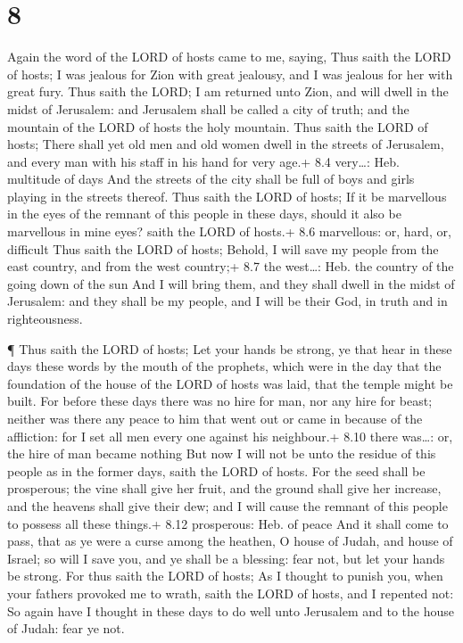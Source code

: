 \hypertarget{section-7}{%
\section{8}\label{section-7}}

 Again the word of the LORD of hosts came to me, saying,
 Thus saith the LORD of hosts; I was jealous for Zion with
great jealousy, and I was jealous for her with great fury. 
Thus saith the LORD; I am returned unto Zion, and will dwell in the
midst of Jerusalem: and Jerusalem shall be called a city of truth; and
the mountain of the LORD of hosts the holy mountain.  Thus
saith the LORD of hosts; There shall yet old men and old women dwell in
the streets of Jerusalem, and every man with his staff in his hand for
very age.+ 8.4 very\ldots: Heb. multitude of days  And the
streets of the city shall be full of boys and girls playing in the
streets thereof.  Thus saith the LORD of hosts; If it be
marvellous in the eyes of the remnant of this people in these days,
should it also be marvellous in mine eyes? saith the LORD of hosts.+ 8.6
marvellous: or, hard, or, difficult  Thus saith the LORD of
hosts; Behold, I will save my people from the east country, and from the
west country;+ 8.7 the west\ldots: Heb. the country of the going down of
the sun  And I will bring them, and they shall dwell in the
midst of Jerusalem: and they shall be my people, and I will be their
God, in truth and in righteousness.

 ¶ Thus saith the LORD of hosts; Let your hands be strong,
ye that hear in these days these words by the mouth of the prophets,
which were in the day that the foundation of the house of the LORD of
hosts was laid, that the temple might be built.  For before
these days there was no hire for man, nor any hire for beast; neither
was there any peace to him that went out or came in because of the
affliction: for I set all men every one against his neighbour.+ 8.10
there was\ldots: or, the hire of man became nothing  But
now I will not be unto the residue of this people as in the former days,
saith the LORD of hosts.  For the seed shall be prosperous;
the vine shall give her fruit, and the ground shall give her increase,
and the heavens shall give their dew; and I will cause the remnant of
this people to possess all these things.+ 8.12 prosperous: Heb. of peace
 And it shall come to pass, that as ye were a curse among
the heathen, O house of Judah, and house of Israel; so will I save you,
and ye shall be a blessing: fear not, but let your hands be strong.
 For thus saith the LORD of hosts; As I thought to punish
you, when your fathers provoked me to wrath, saith the LORD of hosts,
and I repented not:  So again have I thought in these days
to do well unto Jerusalem and to the house of Judah: fear ye not.

